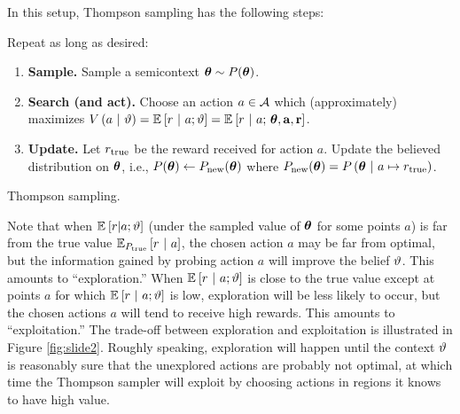 In this setup, Thompson sampling has the following steps:
\begin{algorithm}[H]
  \singlespacing
  Repeat as long as desired:
  \begin{enumerate}
    \item\label{itm:thompson-step-sample} {\bf Sample.} Sample a semicontext
      $\thetabf \sim P(\thetabf)$.
    \item\label{itm:thompson-step-search} {\bf Search (and act).} Choose an
      action $a \in \Acal$ which (approximately) maximizes $V\pn{a \mvert
      \ttheta} = \Ebkt{r \mvert a; \ttheta} = \Ebkt{r \mvert a;\,\thetabf,
      \abf, \rbf}$.
    \item {\bf Update.} Let $r_\true$ be the reward received for action $a$.
      Update the believed distribution on $\thetabf$, i.e., $P(\thetabf) \gets
      P_\rmnew(\thetabf)$ where $P_\rmnew(\thetabf) = P\pn{\thetabf \mvert a \mapsto
      r_\true}$.
  \end{enumerate}
  \caption{Thompson sampling.}
  \label{alg:thompson}
\end{algorithm}
Note that when $\Ebkt{r|a;\ttheta}$ (under the sampled value of $\thetabf$ for
some points $a$) is far from the true value $\Ebkt[P_\true]{r \mvert a}$, the
chosen action $a$ may be far from optimal, but the information gained by probing
action $a$ will improve the belief $\ttheta$.  This amounts to ``exploration.''
When $\Ebkt{r \mvert a;\ttheta}$ is close to the true value except at points $a$
for which $\Ebkt{r \mvert a;\ttheta}$ is low, exploration will be less likely to
occur, but the chosen actions $a$ will tend to receive high rewards.  This
amounts to ``exploitation.'' The trade-off between exploration and exploitation
is illustrated in Figure \ref{fig:slide2}.  Roughly speaking, exploration will
happen until the context $\ttheta$ is reasonably sure that the unexplored
actions are probably not optimal, at which time the Thompson sampler will
exploit by choosing actions in regions it knows to have high value.

